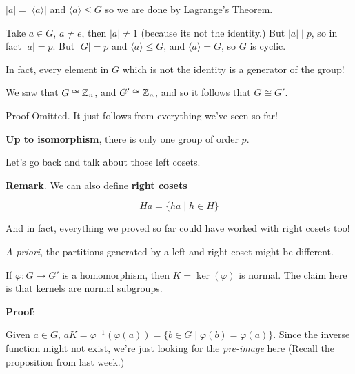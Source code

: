 \documentclass[12pt]{article}
\def\phi{\varphi}
\newcommand{\lr}[1]{\langle #1 \rangle}
\begin{document}
{
  $|a| = |\lr {a}|$ and $\lr {a} \le G$ so we are done by Lagrange's Theorem.
}


{
  Take $a \in G$, $a \ne e$, then $|a| \ne 1$ (because its not the identity.)
  But $|a| \mid p$, so in fact $|a| = p$. But $|G| = p$ and $\lr {a} \le G$, and
  $\lr {a} = G$, so $G$ is cyclic.

  In fact, every element in $G$ which is not the identity is a generator of the
  group!
}

{
  We saw that $G \cong {\mathbb Z}_n$, and $G' \cong {\mathbb Z}_n$, and so it follows that $G
  \cong G'$.
}

{
  Proof Omitted. It just follows from everything we've seen so far!

  {\bf Up to isomorphism}, there is only one group of order $p$.
}

Let's go back and talk about those left cosets.

{\bf Remark}. We can also define {\bf right cosets}

\[
  Ha = \{ ha \mid h \in H \}
\]

And in fact, everything we proved so far could have worked with right cosets
too!

{\it A priori}, the partitions generated by a left and right coset might be
different.


If $\phi: G \to G'$ is a homomorphism, then $K = \ker(\phi)$ is normal. The
claim here is that kernels are normal subgroups.

{\bf Proof}:

Given $a \in G$, $aK = \phi^{-1}(\phi(a)) = \{b \in G \mid \phi(b) =
\phi(a)\}$. Since the inverse function might not exist, we're just looking for
the {\it pre-image} here (Recall the proposition from last week.)

\end{document}
